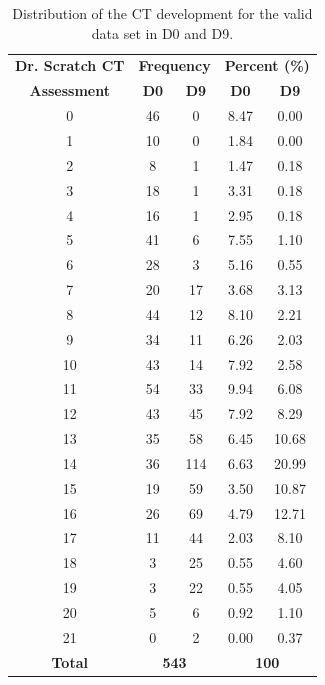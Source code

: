 \begin{table}
    \centering
    \begin{tabular}{|c|c|c|c|c|}
        \hline
        \textbf{Dr. Scratch CT} & \multicolumn{2}{|c|}{\textbf{Frequency}} & \multicolumn{2}{|c|}{\textbf{Percent (\%)}} \\ \cline{2-5}
        \textbf{Assessment} & \textbf{D0} & \textbf{D9} & \textbf{D0} & \textbf{D9}   \\ \hline 
        0 & 46 & 0 & 8.47 & 0.00 \\ \hline
        1 & 10 & 0 & 1.84 & 0.00 \\ \hline
        2 & 8 & 1 & 1.47 & 0.18 \\ \hline
        3 & 18 & 1 & 3.31 & 0.18 \\ \hline
        4 & 16 & 1 & 2.95 & 0.18 \\ \hline
        5 & 41 & 6 & 7.55 & 1.10 \\ \hline
        6 & 28 & 3 & 5.16 & 0.55 \\ \hline
        7 & 20 & 17 & 3.68 & 3.13 \\ \hline
        8 & 44 & 12 & 8.10 & 2.21 \\ \hline
        9 & 34 & 11 & 6.26 & 2.03 \\ \hline
        10 & 43 & 14 & 7.92 & 2.58 \\ \hline
        11 & 54 & 33 & 9.94 & 6.08 \\ \hline
        12 & 43 & 45 & 7.92 & 8.29 \\ \hline
        13 & 35 & 58 & 6.45 & 10.68 \\ \hline
        14 & 36 & 114 & 6.63 & 20.99 \\ \hline
        15 & 19 & 59 & 3.50 & 10.87 \\ \hline
        16 & 26 & 69 & 4.79 & 12.71 \\ \hline
        17 & 11 & 44 & 2.03 & 8.10 \\ \hline
        18 & 3 & 25 & 0.55 & 4.60 \\ \hline
        19 & 3 & 22 & 0.55 & 4.05 \\ \hline
        20 & 5 & 6 & 0.92 & 1.10 \\ \hline
        21 & 0 & 2 & 0.00 & 0.37 \\ \hline
        \textbf{Total} & \multicolumn{2}{|c|}{\textbf{543}} & \multicolumn{2}{|c|}{\textbf{100}} \\ \hline
    \end{tabular}
    \caption{Distribution of the CT development for the valid data set in D0 and D9.}
    \label{table:ct_development_deciles}
\end{table}

